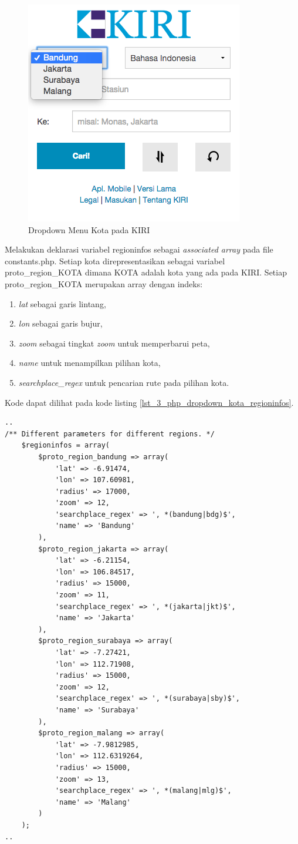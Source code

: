 \begin{figure}[H]
	\centering
	\includegraphics[scale=0.5]{Gambar/KIRI-drop-kota}
	\caption{Dropdown Menu Kota pada KIRI} 
	\label{fig:3_KIRI_drop_kota}
\end{figure}

Melakukan deklarasi variabel regioninfos sebagai \textit{associated array} pada file constants.php. Setiap kota direpresentasikan sebagai variabel proto\_region\_KOTA dimana KOTA adalah kota yang ada pada KIRI. Setiap proto\_region\_KOTA merupakan array dengan indeks:
\begin{enumerate}
	\item \textit{lat} sebagai garis lintang,
	\item \textit{lon} sebagai garis bujur,
	\item \textit{zoom} sebagai tingkat \textit{zoom} untuk memperbarui peta,
	\item \textit{name} untuk menampilkan pilihan kota,
	\item \textit{searchplace\_regex} untuk pencarian rute pada pilihan kota.
\end{enumerate} 
Kode dapat dilihat pada kode listing \ref{lst_3_php_dropdown_kota_regioninfos}.

\begin{lstlisting}[caption=Deklarasi variabel regioninfos,label = {lst_3_php_dropdown_kota_regioninfos}]
..
/** Different parameters for different regions. */
	$regioninfos = array(
		$proto_region_bandung => array(
			'lat' => -6.91474,
			'lon' => 107.60981,
			'radius' => 17000,
			'zoom' => 12,
			'searchplace_regex' => ', *(bandung|bdg)$',
			'name' => 'Bandung'
		),
		$proto_region_jakarta => array(
			'lat' => -6.21154,
			'lon' => 106.84517,
			'radius' => 15000,
			'zoom' => 11,
			'searchplace_regex' => ', *(jakarta|jkt)$',
			'name' => 'Jakarta'
		),
		$proto_region_surabaya => array(
			'lat' => -7.27421,
			'lon' => 112.71908,
			'radius' => 15000,
			'zoom' => 12,
			'searchplace_regex' => ', *(surabaya|sby)$',
			'name' => 'Surabaya'
		),
		$proto_region_malang => array(
			'lat' => -7.9812985,
			'lon' => 112.6319264,
			'radius' => 15000,
			'zoom' => 13,
			'searchplace_regex' => ', *(malang|mlg)$',
			'name' => 'Malang'				
		)
	);
..
\end{lstlisting}

